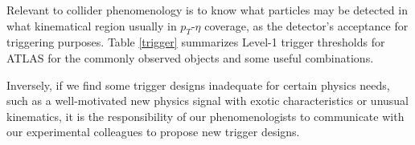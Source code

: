 \documentclass[prd,aps,floats,preprintnumbers,preprint,superscriptaddress,floatfix,nofootinbib]{revtex4}
\newcommand{ \slashchar }[1]{\setbox0=\hbox{$#1$}   %
   \dimen0=\wd0                                     %
   \setbox1=\hbox{/} \dimen1=\wd1                   %
   \ifdim\dimen0>\dimen1                            %
      \rlap{\hbox to \dimen0{\hfil/\hfil}}          %
      #1                                            %
   \else                                            %
      \rlap{\hbox to \dimen1{\hfil$#1$\hfil}}       %
      /                                             %
   \fi}                                             %
\def\etmiss{\slashchar{E}_{T}}
\def\pt{p_T^{}}
\begin{document}
%

Relevant to collider phenomenology is to know 
what particles may be detected in 
what kinematical region usually in $p_T$-$\eta$ coverage,  
as the detector's acceptance for triggering purposes.
Table \ref{trigger} summarizes Level-1 trigger thresholds for
ATLAS for the commonly observed objects and some useful combinations.

Inversely, if we find some trigger designs inadequate for certain physics 
needs, such as a well-motivated new physics signal with
exotic characteristics or unusual kinematics, 
it is the responsibility of our phenomenologists to communicate 
with our experimental colleagues to propose new trigger designs.
\end{document}
